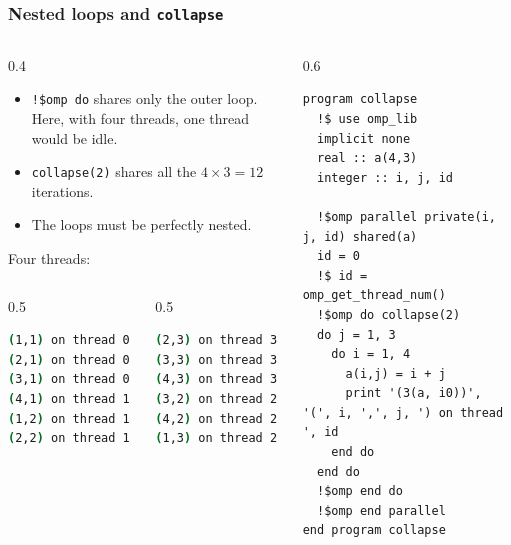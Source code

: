 \begin{frame}[fragile]
  \frametitle{Nested loops and \texttt{collapse}}
  \begin{columns}[T]
    \begin{column}{0.4\textwidth}
      \begin{itemize}
        \item \texttt{!\$omp do} shares only the outer loop. Here, with four threads, one thread would be idle.
        \item \texttt{collapse(2)} shares all the $4 \times 3 = 12$ iterations.
        \item The loops must be perfectly nested.
      \end{itemize}

      \vspace*{1mm}
      Four threads:
      \begin{columns}[T]
        \begin{column}{0.5\textwidth}
          \begin{lstlisting}[language=bash]
(1,1) on thread 0
(2,1) on thread 0
(3,1) on thread 0
(4,1) on thread 1
(1,2) on thread 1
(2,2) on thread 1
          \end{lstlisting}
        \end{column}
        \begin{column}{0.5\textwidth}
          \begin{lstlisting}[language=bash]
(2,3) on thread 3
(3,3) on thread 3
(4,3) on thread 3
(3,2) on thread 2
(4,2) on thread 2
(1,3) on thread 2
          \end{lstlisting}
        \end{column}
      \end{columns}
    \end{column}

    \begin{column}{0.6\textwidth}
      \begin{lstlisting}
program collapse
  !$ use omp_lib
  implicit none
  real :: a(4,3)
  integer :: i, j, id

  !$omp parallel private(i, j, id) shared(a)
  id = 0
  !$ id = omp_get_thread_num()
  !$omp do collapse(2)
  do j = 1, 3
    do i = 1, 4
      a(i,j) = i + j
      print '(3(a, i0))', '(', i, ',', j, ') on thread ', id
    end do
  end do
  !$omp end do
  !$omp end parallel
end program collapse
      \end{lstlisting}
    \end{column}
  \end{columns}
\end{frame}



